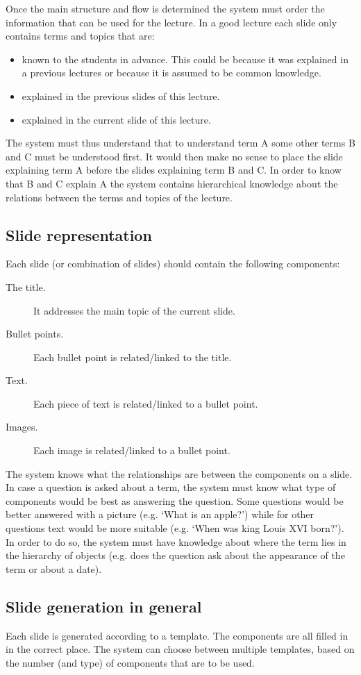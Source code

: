 \documentclass[11pt]{article}
\begin{document}
Once the main structure and flow is determined the system must order the information that can be used for the lecture. In a good lecture each slide only contains terms and topics that are:
\begin{itemize}
\item known to the students in advance. This could be because it was explained in a previous lectures or because it is assumed to be common knowledge.
\item explained in the previous slides of this lecture.
\item explained in the current slide of this lecture.
\end{itemize}
The system must thus understand that to understand term A some other terms B and C must be understood first. It would then make no sense to place the slide explaining term A before the slides explaining term B and C. In order to know that B and C explain A the system contains hierarchical knowledge about the relations between the terms and topics of the lecture.

\subsection{Slide representation}
Each slide (or combination of slides) should contain the following components:
\begin{description}
\item[The title.] It addresses the main topic of the current slide.
\item[Bullet points.] Each bullet point is related/linked to the title. 
\item[Text.] Each piece of text is related/linked to a bullet point.
\item[Images.] Each image is related/linked to a bullet point.
\end{description}
The system knows what the relationships are between the components on a slide. In case a question is asked about a term, the system must know what type of components would be best as answering the question. Some questions would be better answered with a picture (e.g. `What is an apple?') while for other questions text would be more suitable (e.g. `When was king Louis XVI born?'). In order to do so, the system must have knowledge about where the term lies in the hierarchy of objects (e.g. does the question ask about the appearance of the term or about a date).

\subsection{Slide generation in general}
Each slide is generated according to a template. The components are all filled in in the correct place. The system can choose between multiple templates, based on the number (and type) of components that are to be used. 
\end{document}
